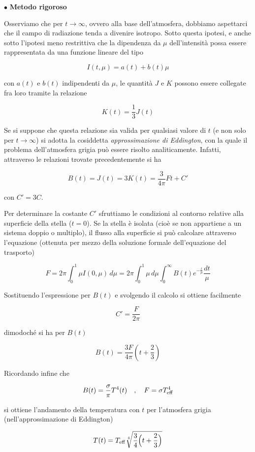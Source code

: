 \vspace{0.2cm}$\bullet$ \textbf{Metodo rigoroso}

\vspace{0.2cm}Osserviamo che per $t \to \infty$, ovvero alla base dell'atmosfera, dobbiamo aspettarci che il campo di radiazione tenda a divenire isotropo. Sotto questa ipotesi, e anche sotto l'ipotesi meno restrittiva che la dipendenza da $\mu$ dell'intensità possa essere rappresentata da una funzione lineare del tipo

$$I(t,\mu)=a(t) + b(t)\mu$$

con $a(t)$ e $b(t)$ indipendenti da $\mu$, le quantità $J$ e $K$ possono essere collegate fra loro tramite la relazione

$$K(t)=\frac{1}{3}J(t)$$

Se si suppone che questa relazione sia valida per qualsiasi valore di $t$ (e non solo per $t \to \infty$) si adotta la cosiddetta \textit{approssimazione di Eddington}, con la quale il problema dell'atmosfera grigia può essere risolto analiticamente. Infatti, attraverso le relazioni trovate precedentemente si ha

$$B(t)=J(t)=3K(t)=\frac{3}{4 \pi}Ft + C'$$

con $C'=3C$.

Per determinare la costante $C'$ sfruttiamo le condizioni al contorno relative alla superficie della stella ($t=0$). Se la stella è isolata (cioè
se non appartiene a un sistema doppio o multiplo), il flusso alla superficie si può calcolare attraverso l'equazione (ottenuta per mezzo della soluzione formale
dell'equazione del trasporto)

$$F=2 \pi \int_{0}^{1} \mu I(0,\mu) \, d\mu
=2 \pi \int_{0}^{1} \mu \, d\mu \int_{0}^{\infty} B(t)e^{-\frac{t}{\mu}} \frac{dt}{\mu}$$

Sostituendo l'espressione per $B(t)$ e svolgendo il calcolo si ottiene facilmente

$$C'=\frac{F}{2 \pi}$$

dimodoché si ha per $B(t)$

$$B(t)=\frac{3F}{4 \pi} \left( t + \frac{2}{3} \right)$$

Ricordando infine che

$$B(t)=\frac{\sigma}{\pi} T^4(t)
\quad,\quad
F=\sigma T_{\rm eff}^4$$

si ottiene l'andamento della temperatura con $t$ per l'atmosfera grigia (nell'approssimazione
di Eddington)

$$T(t)=T_{\rm eff} \sqrt[4]{\frac{3}{4} \Big( t + \frac{2}{3} \Big)}$$

